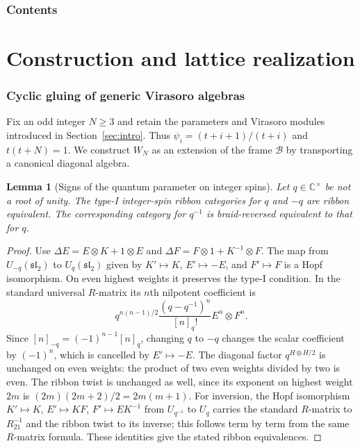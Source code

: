 \documentclass[11pt,a4paper]{article}
\numberwithin{equation}{section}
\newtheorem{lemma}[theorem]{Lemma}
\theoremstyle{definition}\newtheorem{definition}[theorem]{Definition}
\theoremstyle{remark}\newtheorem{remark}[theorem]{Remark}
\begin{document}
\clearpage
\section*{Contents}
\begingroup
\small
\setlength{\parskip}{0pt}
\makeatletter
\renewcommand{\l@section}{\@dottedtocline{1}{0pt}{2.5em}}
\renewcommand{\l@part}[2]{%
  \addpenalty{-\@highpenalty}%
  \addvspace{0.8em}%
  {\bfseries\raggedright #1\par}\nobreak}
\makeatother
\endgroup
\clearpage
\part{Construction and lattice realization}

\section{Cyclic gluing of generic Virasoro algebras}
\label{sec:cyclic-gluing}
Fix an odd integer $N\ge3$ and retain the parameters and Virasoro
modules introduced in Section~\ref{sec:intro}. Thus
$\psi_i=(t+i+1)/(t+i)$ and $t(t+N)=1$. We construct $W_N$ as an
extension of the frame $\mathcal B$ by transporting a canonical
diagonal algebra.

\begin{lemma}[Signs of the quantum parameter on integer spins]\label{c:quantum-sign}
Let $q\in\mathbb C^\times$ be not a root of unity. The type-I
integer-spin ribbon categories for $q$ and $-q$ are ribbon equivalent.  The corresponding
category for $q^{-1}$ is braid-reversed equivalent to that for $q$.
\end{lemma}
\begin{proof}
Use $\Delta E=E\otimes K+1\otimes E$ and
$\Delta F=F\otimes1+K^{-1}\otimes F$.
The map from $U_{-q}(\mathfrak{sl}_2)$ to $U_q(\mathfrak{sl}_2)$ given by
$K'\mapsto K$, $E'\mapsto-E$, and $F'\mapsto F$ is a Hopf isomorphism.
On even highest weights it preserves the type-I condition.  In the
standard universal $R$-matrix its $n$th nilpotent coefficient is
\[
 q^{n(n-1)/2}\frac{(q-q^{-1})^n}{[n]_q!}E^n\otimes F^n.
\]
Since $[n]_{-q}=(-1)^{n-1}[n]_q$, changing $q$ to $-q$ changes the
scalar coefficient by $(-1)^n$, which is cancelled by $E'\mapsto-E$.
The diagonal factor $q^{H\otimes H/2}$ is unchanged on even weights:
the product of two even weights divided by two is even.  The ribbon
twist is unchanged as well, since its exponent on highest weight
$2m$ is $(2m)(2m+2)/2=2m(m+1)$.
For inversion, the Hopf isomorphism
$K'\mapsto K$, $E'\mapsto KF$, $F'\mapsto EK^{-1}$ from
$U_{q^{-1}}$ to $U_q$ carries the standard $R$-matrix to
$R_{21}^{-1}$ and the ribbon twist to its inverse; this follows
term by term from the same $R$-matrix formula.  These identities
give the stated ribbon equivalences.
\end{proof}
\end{document}
